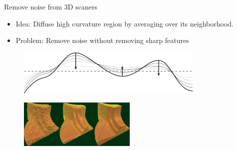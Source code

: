 \documentclass{beamer}
\begin{document}
\begin{frame}{Remove noise from 3D scaners}{}
\begin{itemize}
\item Idea: Diffuse high curvature region by averaging over its neighborhood.
\item Problem: Remove noise without removing sharp features
\end{itemize}
\begin{figure}[htb]
\centering
\includegraphics[width=0.8\textwidth]{ddg_heat_equation.png}
\label{fig:diffuse}
\end{figure}
\begin{figure}[htb]
\centering
\includegraphics[width=0.5\textwidth]{motivation.PNG}
\label{fig:motivation}
\end{figure}
\end{frame}
\end{document}
